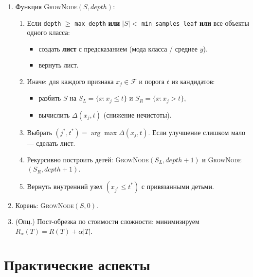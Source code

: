 \documentclass[12pt]{beamer}
\begin{document}
\begin{frame}
	\small

	\begin{enumerate}
		\item Функция \textsc{GrowNode}$(S, depth)$:
		      \begin{enumerate}
			      \item Если \texttt{depth} $\ge$ \texttt{max\_depth} \textbf{или} $|S| <$ \texttt{min\_samples\_leaf} \textbf{или} все объекты одного класса:
			            \begin{itemize}
				            \item создать \textbf{лист} с предсказанием (мода класса / среднее $y$).
				            \item вернуть лист.
			            \end{itemize}
			      \item Иначе: для каждого признака $x_j \in \mathcal{F}$ и порога $t$ из кандидатов:
			            \begin{itemize}
				            \item разбить $S$ на $S_L=\{x: x_j \le t\}$ и $S_R=\{x: x_j > t\}$,
				            \item вычислить $\Delta(x_j,t)$ (снижение нечистоты).
			            \end{itemize}
			      \item Выбрать $(j^*, t^*) = \arg\max \Delta(x_j,t)$. Если улучшение слишком мало — сделать лист.
			      \item Рекурсивно построить детей: \textsc{GrowNode}$(S_L, depth+1)$ и \textsc{GrowNode}$(S_R, depth{+}1)$.
			      \item Вернуть внутренний узел $(x_{j^*}\le t^*)$ с привязанными детьми.
		      \end{enumerate}
		\item Корень: \textsc{GrowNode}$(S,0)$.
		\item (Опц.) Пост-обрезка по стоимости сложности: минимизируем $R_\alpha(T)=R(T)+\alpha|T|$.
	\end{enumerate}
\end{frame}

\section{Практические аспекты}
\end{document}
